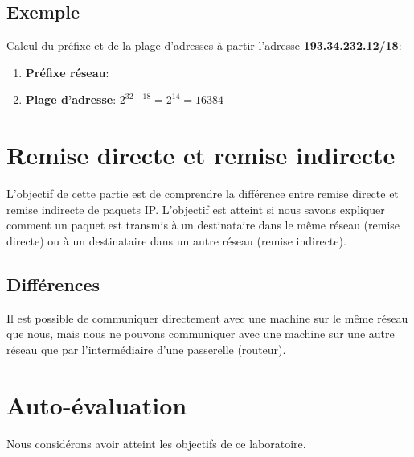 \documentclass[11pt,a4paper]{article}
\begin{document}
\subsection{Exemple}

Calcul du préfixe et de la plage d'adresses à partir l'adresse \textbf{193.34.232.12/18}:

\begin{enumerate}
	\item \textbf{Préfixe réseau}: 
	\item \textbf{Plage d'adresse}: $2^{32-18} = 2^{14} = 16384$
\end{enumerate}

\section{Remise directe et remise indirecte}

L'objectif de cette partie est de comprendre la différence entre remise directe et remise indirecte de paquets IP. L'objectif est atteint si nous savons expliquer comment un paquet est transmis à un destinataire dans le même réseau (remise directe) ou à un destinataire dans un autre réseau (remise indirecte).

\subsection{Différences}

Il est possible de communiquer directement avec une machine sur le même réseau que nous, mais nous ne pouvons communiquer avec une machine sur une autre réseau que par l'intermédiaire d'une passerelle (routeur).

\section{Auto-évaluation}

Nous considérons avoir atteint les objectifs de ce laboratoire.
\end{document}
